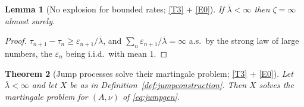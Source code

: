 \documentclass[11pt,a4paper]{article}
\theoremstyle{plain}
\newtheorem{theorem}{Theorem}[section]
\newtheorem{lemma}[theorem]{Lemma}
\theoremstyle{definition}
\theoremstyle{remark}
\begin{document}
\begin{lemma}[No explosion for bounded rates; \eqref{T3} + \eqref{E0}]
  \label{lem:noexplosion}
  If $\bar{\lambda} < \infty$ then $\zeta = \infty$ almost surely.
\end{lemma}

\begin{proof}
  $\tau_{n+1} - \tau_n \geq \varepsilon_{n+1}/\bar{\lambda}$, and
  $\sum_n \varepsilon_{n+1}/\bar{\lambda} = \infty$ a.s.\ by the strong law of
  large numbers, the $\varepsilon_n$ being i.i.d.\ with mean $1$.
\end{proof}

\begin{theorem}[Jump processes solve their martingale problem; \eqref{T3} + \eqref{E0}]
  \label{thm:jumpMP}
  Let $\bar{\lambda} < \infty$ and let $X$ be as in
  Definition~\ref{def:jumpconstruction}.  Then $X$ solves the martingale problem
  for $(A,\nu)$ of \eqref{eq:jumpgen}.
\end{theorem}
\end{document}
